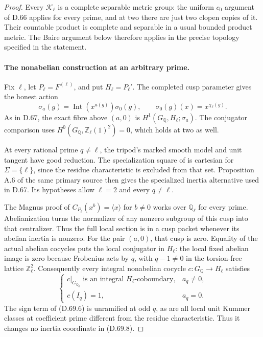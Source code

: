 \begin{proof}
Every \(\mathcal K_\ell\) is a complete
separable metric group: the uniform \(c_0\)
argument of D.66 applies for every prime, and
at two there are just two clopen copies of it.
Their countable product is complete and
separable in a usual bounded product metric.
The Baire argument below therefore applies in
the precise topology specified in the statement.

\paragraph{The nonabelian construction at an arbitrary prime.}
Fix \(\ell\), let \(P_\ell=F^{(\ell)}\),
and put \(H_\ell=P_\ell'\). The completed
cusp parameter gives the honest action
\[
       \sigma_a(g)=\operatorname{Int}(x^{a(g)})\sigma_0(g),
       \qquad\sigma_0(g)(x)=x^{\chi_\ell(g)}.
                                                        \tag{D.69.7}
\]
As in D.67, the exact fibre above \((a,0)\)
is \(H^1(G_{\mathbb Q},H_\ell;\sigma_a)\).
The conjugator comparison uses
\(H^0(G_{\mathbb Q},\mathbb Z_\ell(1)^2)=0\),
which holds at two as well.

At every rational prime \(q\ne\ell\), the
tripod's marked smooth model and unit tangent
have good reduction. The specialization square
of \cite[Definition A.3 and Remark A.3.1]{DE_Hoshi2012}
is cartesian for \(\Sigma=\{\ell\}\), since the
residue characteristic is excluded from that
set. Proposition A.6 of the same primary source
then gives the specialized inertia alternative
used in D.67. Its hypotheses allow \(\ell=2\)
and every \(q\ne\ell\).

The Magnus proof of
\(C_{P_\ell}(x^b)=\langle x\rangle\) for
\(b\ne0\) works over \(\mathbb Q_\ell\) for
every prime. Abelianization turns the normalizer
of any nonzero subgroup of this cusp into that
centralizer. Thus the full local section is in
a cusp packet whenever its abelian inertia is
nonzero. For the pair \((a,0)\), that cusp is
zero. Equality of the actual abelian cocycles
puts the local conjugator in \(H_\ell\): the
local fixed abelian image is zero because
Frobenius acts by \(q\), with \(q-1\ne0\)
in the torsion-free lattice \(\mathbb Z_\ell^2\).
Consequently every integral nonabelian cocycle
\(c:G_{\mathbb Q}\to H_\ell\) satisfies
\[
 \begin{cases}
 c|_{G_{\mathbb Q_q}}\text{ is an integral }H_\ell
                         \text{-coboundary},& a_q\ne0,\\
 c(I_q)=1,&a_q=0.
 \end{cases}                                           \tag{D.69.8}
\]
The sign term of (D.69.6) is unramified at odd
\(q\), as are all local unit Kummer classes
at coefficient prime different from the residue
characteristic. Thus it changes no inertia
coordinate in (D.69.8).


\end{proof}
